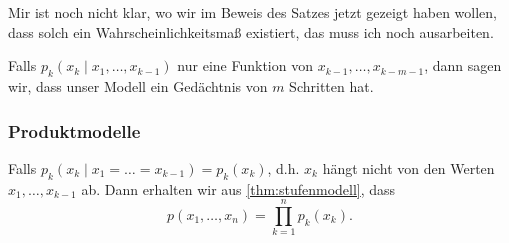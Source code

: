 \begin{note}
    Mir ist noch nicht klar, wo wir im Beweis des Satzes jetzt gezeigt haben wollen, dass solch ein Wahrscheinlichkeitsmaß existiert, das muss ich noch ausarbeiten.
\end{note}
\begin{remark}
    Falls $p_k(x_k \mid  x_1,\ldots,x_{k-1})$ nur eine Funktion von $x_{k-1},\ldots,x_{k-m-1}$, dann sagen wir, dass unser Modell ein Gedächtnis von $m$ Schritten hat.
\end{remark}

\subsubsection{Produktmodelle}
Falls $p_k(x_k \mid  x_1 = \ldots = x_{k-1}) = p_k(x_k)$, d.h. $x_k$ hängt nicht von den Werten  $x_1,\ldots,x_{k-1}$ ab. Dann erhalten wir aus \autoref{thm:stufenmodell}, dass
\[
    p(x_1,\ldots,x_n) = \prod_{k=1}^n p_k(x_k)
.\] 

